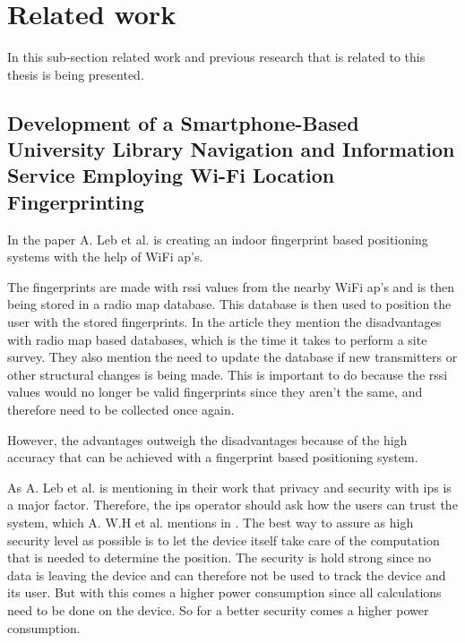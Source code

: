 \section{Related work}\label{sec:theoryRelatedWork}
In this sub-section related work and previous research that is related to this thesis is being presented.


\subsection{Development of a Smartphone-Based University Library Navigation and Information Service Employing Wi-Fi Location Fingerprinting}\label{sec:}
In the paper \cite{DevelopmentSmartphoneBasedUniversity2021} A. Leb et al. is creating an indoor fingerprint based positioning systems with the help of WiFi \acrshort{ap}'s.

\bigskip

The fingerprints are made with \acrshort{rssi} values from the nearby WiFi \acrshort{ap}'s
and is then being stored in a radio map database.
This database is then used to position the user with the stored fingerprints.
In the article they mention the disadvantages with radio map based databases, which is the time it takes to perform a site survey.
They also mention the need to update the database if new transmitters or other structural changes is being made.
This is important to do because the \acrshort{rssi} values would no longer be valid fingerprints since they aren't the same, and therefore need to be collected once again.

\bigskip

However, the advantages outweigh the disadvantages because of the high accuracy that can be achieved with a fingerprint based positioning system.

\bigskip

As A. Leb et al. is mentioning in their work that privacy and security with \acrshort{ips} is a major factor.
Therefore, the \acrshort{ips} operator should ask how the users can trust the system, which A. W.H et al. mentions in \cite{SurveyWirelessIndoor2019}.
The best way to assure as high security level as possible is to let the device itself take care of the computation that is needed to determine the position.
The security is hold strong since no data is leaving the device and can therefore not be used to track the device and its user.
But with this comes a higher power consumption since all calculations need to be done on the device.
So for a better security comes a higher power consumption.

